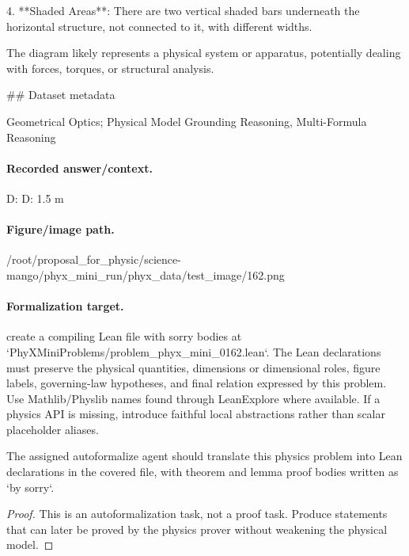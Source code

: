 4. **Shaded Areas**: There are two vertical shaded bars underneath the horizontal structure, not connected to it, with different widths.

The diagram likely represents a physical system or apparatus, potentially dealing with forces, torques, or structural analysis.

\#\# Dataset metadata

Geometrical Optics; Physical Model Grounding Reasoning, Multi-Formula Reasoning

\paragraph{Recorded answer/context.}
D: D: 1.5 m

\paragraph{Figure/image path.}
/root/proposal\_for\_physic/science-mango/phyx\_mini\_run/phyx\_data/test\_image/162.png

\paragraph{Formalization target.}
create a compiling Lean file with sorry bodies at `PhyXMiniProblems/problem\_phyx\_mini\_0162.lean`. The Lean declarations must preserve the physical quantities, dimensions or dimensional roles, figure labels, governing-law hypotheses, and final relation expressed by this problem.
Use Mathlib/Physlib names found through LeanExplore where available. If a physics API is missing, introduce faithful local abstractions rather than scalar placeholder aliases.

\begin{theorem}
\label{thm:physics:phyx_mini_0162:target}
The assigned autoformalize agent should translate this physics problem into Lean declarations in the covered file, with theorem and lemma proof bodies written as `by sorry`.
\end{theorem}
\begin{proof}
This is an autoformalization task, not a proof task. Produce statements that can later be proved by the physics prover without weakening the physical model.
\end{proof}

